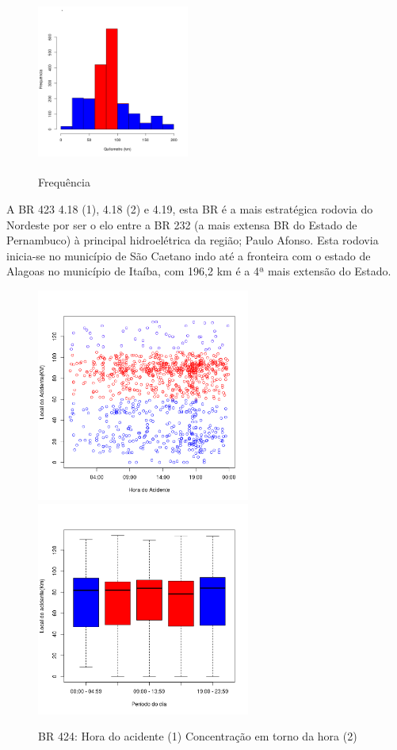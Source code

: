 \quad \quad
\begin{figure}[h]
	\centering
	\caption{ Frequência}
	\includegraphics[width=5cm,height=6cm]{Figuras/Preprocess/br423_3.png}
\end{figure}

A BR 423 4.18 (1), 4.18 (2)  e 4.19, esta BR é a mais estratégica rodovia do Nordeste por ser o elo entre a BR 232 (a mais extensa BR do Estado de Pernambuco) à principal hidroelétrica da região; Paulo Afonso. Esta rodovia inicia-se no município de São Caetano indo até a fronteira com o estado de Alagoas no município de Itaíba, com 196,2 km é a 4ª mais extensão do Estado.
\pagebreak

\begin{figure}[h]
	\caption{BR 424: Hora do acidente (1) Concentração em torno da hora (2)}
	\includegraphics[width=7cm,height=7cm]{Figuras/Preprocess/br424_1.png}
	\includegraphics[width=7cm,height=7cm]{Figuras/Preprocess/br424_2.png}
	
\end{figure}

